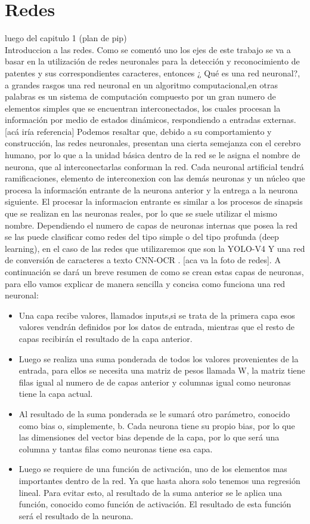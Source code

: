 \section{Redes}

luego del capitulo 1 (plan de pip)\\
Introduccion a las redes.
Como se comentó uno los ejes de este trabajo se va a basar en la utilización de redes neuronales para la detección y reconocimiento de patentes y sus correspondientes caracteres, entonces ¿ Qué es una red neuronal?, a grandes rasgos una red neuronal en un algoritmo computacional,en otras palabras es un sistema de computación compuesto por un gran numero de elementos simples que se encuentran interconectados, los cuales procesan la información por medio de estados dinámicos, respondiendo a entradas externas.[acá iría referencia]
Podemos resaltar que, debido a su comportamiento y construcción, las redes neuronales, presentan una cierta semejanza con el cerebro humano, por lo que a la unidad básica dentro de la red se le asigna el nombre de neurona, que al interconectarlas conforman la red.
Cada neuronal artificial tendrá ramificaciones, elemento de interconexion con las demás neuronas y un núcleo que procesa la información entrante de la neurona anterior y la entrega a la neurona siguiente. El procesar la informacion entrante es similar a los procesos de sinapsis que se realizan en las neuronas reales, por lo que se suele utilizar el mismo nombre.
Dependiendo el numero de capas de neuronas internas que posea la red se las puede clasificar como redes del tipo simple o del tipo profunda (deep learning), en el caso de las redes que utilizaremos que son la YOLO-V4 Y una red de conversión de caracteres a texto CNN-OCR .
[aca va la foto de redes].
A continuación se dará un breve resumen de como se crean estas capas de neuronas, para ello vamos explicar de manera sencilla y concisa como funciona una red neuronal:
\begin{itemize}
\item Una capa recibe valores, llamados inputs,si se trata de la primera capa esos valores vendrán definidos por los datos de entrada, mientras que el resto de capas recibirán el resultado de la capa anterior.
\item Luego se realiza una suma ponderada de todos los valores provenientes de la entrada, para ellos se necesita una matriz de pesos llamada W, la matriz tiene filas igual al numero de de capas anterior y columnas igual como neuronas tiene la capa actual.
\item Al resultado de la suma ponderada se le sumará otro parámetro, conocido como bias o, simplemente, b. Cada neurona tiene su propio bias, por lo que las dimensiones del vector bias depende de la capa, por lo que será una columna y tantas filas como neuronas tiene esa capa.
\item Luego se requiere de una función de activación, uno de los elementos mas importantes dentro de la red. Ya que hasta ahora solo tenemos una regresión lineal. Para evitar esto, al resultado de la suma anterior se le aplica una función, conocido como función de activación. El resultado de esta función será el resultado de la neurona.
\end{itemize}

